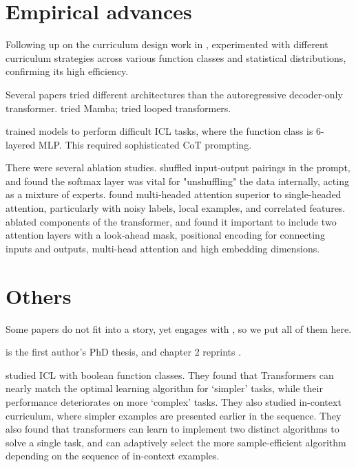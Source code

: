\documentclass[12pt]{article}
\begin{document}
\section{Empirical advances}

Following up on the curriculum design work in \cite{gargWhatCanTransformers2022}, 
\cite{bhasinHowDoesMultiTask2024} experimented with different curriculum strategies across various function classes and statistical distributions, confirming its high efficiency.

Several papers tried different architectures than the autoregressive decoder-only transformer. \cite{grazziMambaCapableInContext2024} tried Mamba;  \cite{yangLoopedTransformersAre2024, gaoExpressivePowerVariant2024} tried looped transformers. 

\cite{liDissectingChainofThoughtCompositionality2023} trained models to perform difficult ICL tasks, where the function class is 6-layered MLP. This required sophisticated CoT prompting.

There were several ablation studies. \cite{wibisonoRoleUnstructuredTraining2023} shuffled input-output pairings in the prompt, and found the softmax layer was vital for "unshuffling" the data internally, acting as a mixture of experts. \cite{cuiSuperiorityMultiHeadAttention2024} found multi-headed attention superior to single-headed attention, particularly with noisy labels, local examples, and correlated features. \cite{xingBenefitsTransformerInContext2024} ablated components of the transformer, and found it important to include two attention layers with a look-ahead mask, positional encoding for connecting inputs and outputs, multi-head attention and high embedding dimensions.


\section{Others}

Some papers do not fit into a story, yet engages with \cite{gargWhatCanTransformers2022}, so we put all of them here.

\cite{gargNatureLearningLearning2023} is the first author's PhD thesis, and chapter 2 reprints \cite{gargWhatCanTransformers2022}.

\cite{bhattamishraUnderstandingInContextLearning2023} studied ICL with boolean function classes. They found that Transformers can nearly match the optimal learning algorithm for ‘simpler’ tasks, while their performance deteriorates on more ‘complex’ tasks. They also studied in-context curriculum, where simpler examples are presented earlier in the sequence. They also found that transformers can learn to implement two distinct algorithms to solve a single task, and can adaptively select the more sample-efficient algorithm depending on the sequence of in-context examples.
\end{document}
